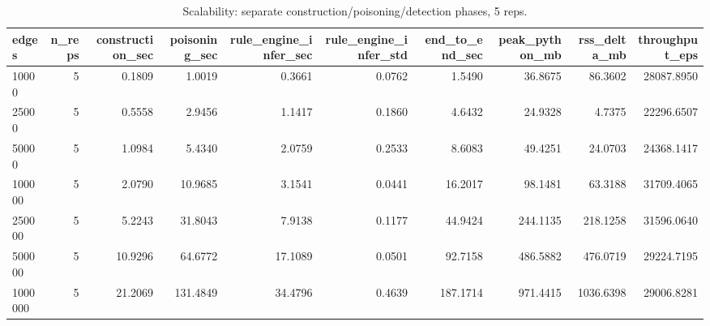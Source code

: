 \begin{table}[htbp]
\centering
\caption{Scalability: separate construction/poisoning/detection phases, 5 reps.}
\label{tab:scalability}
\begin{tabular}{lrrrrrrrrr}
\hline
edges & n_reps & construction_sec & poisoning_sec & rule_engine_infer_sec & rule_engine_infer_std & end_to_end_sec & peak_python_mb & rss_delta_mb & throughput_eps \\
\hline
10000 & 5 & 0.1809 & 1.0019 & 0.3661 & 0.0762 & 1.5490 & 36.8675 & 86.3602 & 28087.8950 \\
25000 & 5 & 0.5558 & 2.9456 & 1.1417 & 0.1860 & 4.6432 & 24.9328 & 4.7375 & 22296.6507 \\
50000 & 5 & 1.0984 & 5.4340 & 2.0759 & 0.2533 & 8.6083 & 49.4251 & 24.0703 & 24368.1417 \\
100000 & 5 & 2.0790 & 10.9685 & 3.1541 & 0.0441 & 16.2017 & 98.1481 & 63.3188 & 31709.4065 \\
250000 & 5 & 5.2243 & 31.8043 & 7.9138 & 0.1177 & 44.9424 & 244.1135 & 218.1258 & 31596.0640 \\
500000 & 5 & 10.9296 & 64.6772 & 17.1089 & 0.0501 & 92.7158 & 486.5882 & 476.0719 & 29224.7195 \\
1000000 & 5 & 21.2069 & 131.4849 & 34.4796 & 0.4639 & 187.1714 & 971.4415 & 1036.6398 & 29006.8281 \\
\hline
\end{tabular}
\end{table}
